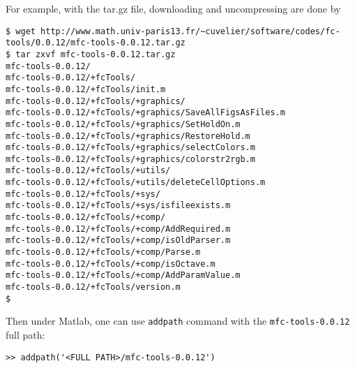For example, with the tar.gz file, downloading and uncompressing are done by 
\begin{verbatim}
$ wget http://www.math.univ-paris13.fr/~cuvelier/software/codes/fc-tools/0.0.12/mfc-tools-0.0.12.tar.gz
$ tar zxvf mfc-tools-0.0.12.tar.gz
mfc-tools-0.0.12/
mfc-tools-0.0.12/+fcTools/
mfc-tools-0.0.12/+fcTools/init.m
mfc-tools-0.0.12/+fcTools/+graphics/
mfc-tools-0.0.12/+fcTools/+graphics/SaveAllFigsAsFiles.m
mfc-tools-0.0.12/+fcTools/+graphics/SetHoldOn.m
mfc-tools-0.0.12/+fcTools/+graphics/RestoreHold.m
mfc-tools-0.0.12/+fcTools/+graphics/selectColors.m
mfc-tools-0.0.12/+fcTools/+graphics/colorstr2rgb.m
mfc-tools-0.0.12/+fcTools/+utils/
mfc-tools-0.0.12/+fcTools/+utils/deleteCellOptions.m
mfc-tools-0.0.12/+fcTools/+sys/
mfc-tools-0.0.12/+fcTools/+sys/isfileexists.m
mfc-tools-0.0.12/+fcTools/+comp/
mfc-tools-0.0.12/+fcTools/+comp/AddRequired.m
mfc-tools-0.0.12/+fcTools/+comp/isOldParser.m
mfc-tools-0.0.12/+fcTools/+comp/Parse.m
mfc-tools-0.0.12/+fcTools/+comp/isOctave.m
mfc-tools-0.0.12/+fcTools/+comp/AddParamValue.m
mfc-tools-0.0.12/+fcTools/version.m
$
\end{verbatim}
Then under Matlab, one can use \texttt{addpath} command with the \texttt{mfc-tools-0.0.12} full path:
\begin{verbatim}
>> addpath('<FULL PATH>/mfc-tools-0.0.12')
\end{verbatim}
 






